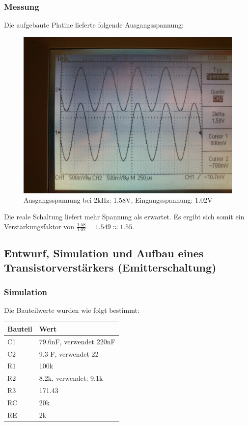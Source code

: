 \subsubsection*{Messung}
Die aufgebaute Platine lieferte folgende Ausgangsspannung:
\begin{figure}[H]
	\centering
	\includegraphics[width=\linewidth]{versuch5/oszi/DSC_0444.JPG}
	\caption{Ausgangsspannung bei 2kHz: 1.58V, Eingangsspannung: 1.02V}
\end{figure}
Die reale Schaltung liefert mehr Spannung als erwartet. Es ergibt sich somit ein Verstärkungsfaktor von $\frac{1.58}{1.02}=1.549\approx1.55$.


\subsection{Entwurf, Simulation und Aufbau eines Transistorverstärkers (Emitterschaltung)}
\subsubsection*{Simulation}
Die Bauteilwerte wurden wie folgt bestimmt:\\
\begin{tabular}{ll}
	Bauteil & Wert\\
	\hline
	C1 & 79.6nF, verwendet 220nF\\
	C2 & 9.3 \mikro F, verwendet 22 \\
	R1 & 100k\Ohm\\
	R2 & 8.2k\Ohm, verwendet: 9.1k\Ohm\\
	R3 & 171.43\Ohm\\
	RC & 20k\Ohm\\
	RE & 2k\Ohm\\
\end{tabular}

